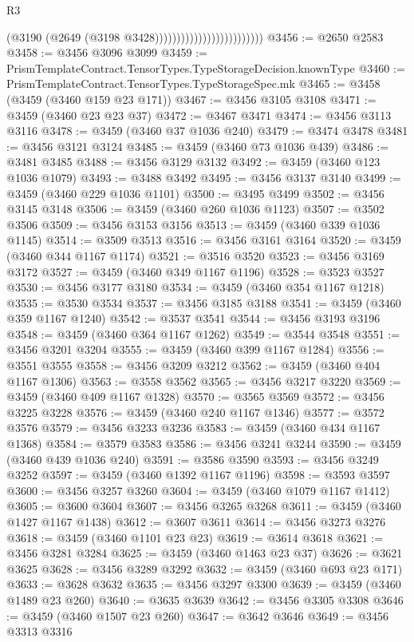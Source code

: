 \begin{lexlean}{R3}
\begin{coremodule}
                                                (@3190 (@2649 (@3198 @3428)))))))))))))))))))))))))
@3456 := @2650 @2583
@3458 := @3456 @3096 @3099
@3459 := PrismTemplateContract.TensorTypes.TypeStorageDecision.knownType
@3460 := PrismTemplateContract.TensorTypes.TypeStorageSpec.mk
@3465 := @3458 (@3459 (@3460 @159 @23 @171))
@3467 := @3456 @3105 @3108
@3471 := @3459 (@3460 @23 @23 @37)
@3472 := @3467 @3471
@3474 := @3456 @3113 @3116
@3478 := @3459 (@3460 @37 @1036 @240)
@3479 := @3474 @3478
@3481 := @3456 @3121 @3124
@3485 := @3459 (@3460 @73 @1036 @439)
@3486 := @3481 @3485
@3488 := @3456 @3129 @3132
@3492 := @3459 (@3460 @123 @1036 @1079)
@3493 := @3488 @3492
@3495 := @3456 @3137 @3140
@3499 := @3459 (@3460 @229 @1036 @1101)
@3500 := @3495 @3499
@3502 := @3456 @3145 @3148
@3506 := @3459 (@3460 @260 @1036 @1123)
@3507 := @3502 @3506
@3509 := @3456 @3153 @3156
@3513 := @3459 (@3460 @339 @1036 @1145)
@3514 := @3509 @3513
@3516 := @3456 @3161 @3164
@3520 := @3459 (@3460 @344 @1167 @1174)
@3521 := @3516 @3520
@3523 := @3456 @3169 @3172
@3527 := @3459 (@3460 @349 @1167 @1196)
@3528 := @3523 @3527
@3530 := @3456 @3177 @3180
@3534 := @3459 (@3460 @354 @1167 @1218)
@3535 := @3530 @3534
@3537 := @3456 @3185 @3188
@3541 := @3459 (@3460 @359 @1167 @1240)
@3542 := @3537 @3541
@3544 := @3456 @3193 @3196
@3548 := @3459 (@3460 @364 @1167 @1262)
@3549 := @3544 @3548
@3551 := @3456 @3201 @3204
@3555 := @3459 (@3460 @399 @1167 @1284)
@3556 := @3551 @3555
@3558 := @3456 @3209 @3212
@3562 := @3459 (@3460 @404 @1167 @1306)
@3563 := @3558 @3562
@3565 := @3456 @3217 @3220
@3569 := @3459 (@3460 @409 @1167 @1328)
@3570 := @3565 @3569
@3572 := @3456 @3225 @3228
@3576 := @3459 (@3460 @240 @1167 @1346)
@3577 := @3572 @3576
@3579 := @3456 @3233 @3236
@3583 := @3459 (@3460 @434 @1167 @1368)
@3584 := @3579 @3583
@3586 := @3456 @3241 @3244
@3590 := @3459 (@3460 @439 @1036 @240)
@3591 := @3586 @3590
@3593 := @3456 @3249 @3252
@3597 := @3459 (@3460 @1392 @1167 @1196)
@3598 := @3593 @3597
@3600 := @3456 @3257 @3260
@3604 := @3459 (@3460 @1079 @1167 @1412)
@3605 := @3600 @3604
@3607 := @3456 @3265 @3268
@3611 := @3459 (@3460 @1427 @1167 @1438)
@3612 := @3607 @3611
@3614 := @3456 @3273 @3276
@3618 := @3459 (@3460 @1101 @23 @23)
@3619 := @3614 @3618
@3621 := @3456 @3281 @3284
@3625 := @3459 (@3460 @1463 @23 @37)
@3626 := @3621 @3625
@3628 := @3456 @3289 @3292
@3632 := @3459 (@3460 @693 @23 @171)
@3633 := @3628 @3632
@3635 := @3456 @3297 @3300
@3639 := @3459 (@3460 @1489 @23 @260)
@3640 := @3635 @3639
@3642 := @3456 @3305 @3308
@3646 := @3459 (@3460 @1507 @23 @260)
@3647 := @3642 @3646
@3649 := @3456 @3313 @3316

\end{coremodule}
\end{lexlean}
